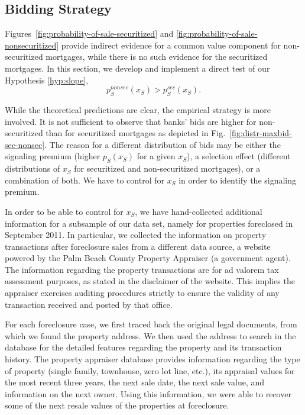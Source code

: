 \documentclass[11pt,twopage]{article}
\begin{document}

\subsection{Bidding Strategy}

Figures~\ref{fig:probability-of-sale-securitized} and
\ref{fig:probability-of-sale-nonsecuritized} provide indirect evidence
for a common value component for non-securitized mortgages, while there is no such evidence for the securitized mortgages. In this section, we develop and implement a direct test of our Hypothesis \ref{hyp:slope},
\[ p_S^{nonsec}(x_S) > p_S^{sec}(x_S).\]

While the theoretical predictions are clear, the empirical strategy is more involved. It is not sufficient to observe that
banks' bids are higher for non-securitized than for securitized mortgages as depicted in Fig.~\ref{fig:distr-maxbid-sec-nonsec}. The reason for a different distribution of bids may
be either the signaling premium (higher $p_S(x_S)$ for a given $x_S$), a selection effect (different distributions
of $x_S$ for securitized and non-securitized mortgages), or a combination of both. We have to control for $x_S$ in order to
identify the signaling premium.


In order to be able to control for $x_S$, we have hand-collected additional information for a subsample of our data set, namely for properties foreclosed in September 2011. In particular, we collected the information on property transactions after foreclosure sales from a different data source, a website powered by the Palm Beach County Property Appraiser (a government agent). The information regarding the property transactions are for ad valorem tax assessment purposes, as stated in the disclaimer of the website. This implies the appraiser exercises auditing procedures strictly to ensure the validity of any transaction received and posted by that office.

For each foreclosure case, we first traced back the original legal documents, from which we found the property address. We then used the address to search in the database for the detailed features regarding the property and its transaction history. The property appraiser database provides information regarding the type of property (single family, townhouse, zero lot line, etc.), its appraisal values for the most recent three years, the next sale date, the next sale value, and information on the next owner. Using this information, we were able to recover some of the next resale values of the properties at foreclosure.
\end{document}
